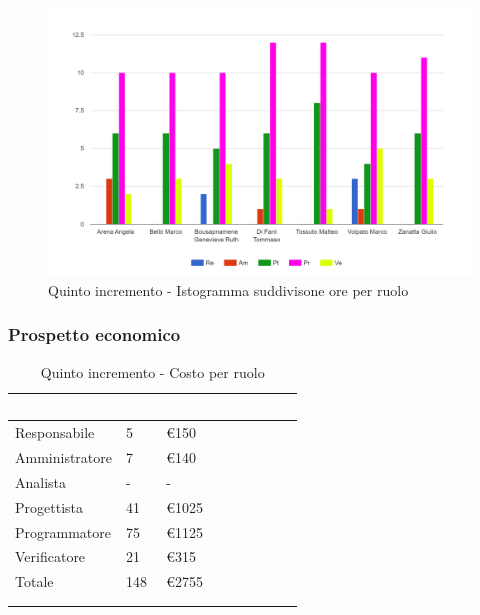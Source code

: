 {{      \begin{figure}[H]
        \includegraphics[width=15cm]{sezioni/images/quinto.png}
        \centering
        \caption{Quinto incremento - Istogramma suddivisone ore per ruolo}
     \end{figure}
    }

    \subsubsection{Prospetto economico}
    {
        \setlength{\freewidth}{\dimexpr\textwidth-30\tabcolsep}
        \renewcommand{\arraystretch}{1.0}
        \setlength{\aboverulesep}{0pt}
        \setlength{\belowrulesep}{0pt}
        \begin{longtable}{C{.4\freewidth} C{.2\freewidth} C{.2\freewidth} C{.2\freewidth} C{.2\freewidth} C{.2\freewidth} C{.2\freewidth} C{.2\freewidth} C{.2\freewidth}}
          \toprule
        \textcolor{white}{\textbf{Ruolo}}&
        \textcolor{white}{\textbf{Ore}}&
        \textcolor{white}{\textbf{Costo}}\\
        \toprule
        \endhead
            
        Responsabile  & 5 & \euro150\\
        Amministratore  & 7 & \euro140 \\
        Analista &- & -\\
        Progettista &41 &\euro1025\\
        Programmatore &75 & \euro1125\\
        Verificatore &21 &\euro315\\
        Totale&148&\euro2755\\
        \bottomrule
      \\
        \caption{Quinto incremento - Costo per ruolo}


\end{longtable}}}
